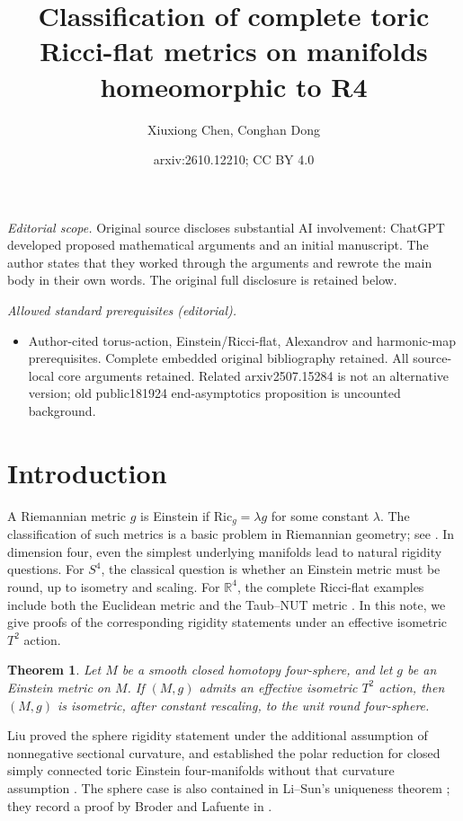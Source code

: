 \documentclass[letterpaper]{amsart}
\title{Classification of complete toric Ricci-flat metrics on manifolds homeomorphic to R4}
\author{Xiuxiong Chen, Conghan Dong}
\date{arxiv:2610.12210; CC BY 4.0}
\newtheorem{thm}{Theorem}[section]
\theoremstyle{definition}
\theoremstyle{remark}
\begin{document}
\maketitle
\noindent\textit{Editorial scope.} Original source discloses substantial AI involvement: ChatGPT developed proposed mathematical arguments and an initial manuscript. The author states that they worked through the arguments and rewrote the main body in their own words. The original full disclosure is retained below.\par\medskip
\noindent\textit{Allowed standard prerequisites (editorial).}\begin{itemize}
\item Author-cited torus-action, Einstein/Ricci-flat, Alexandrov and harmonic-map prerequisites. Complete embedded original bibliography retained. All source-local core arguments retained. Related arxiv2507.15284 is not an alternative version; old public181924 end-asymptotics proposition is uncounted background.
\end{itemize}\medskip
\section{Introduction}
A Riemannian metric $g$ is Einstein if $\mathrm{Ric}_g=\lambda g$ for
some constant $\lambda$. The classification of such metrics is a basic
problem in Riemannian geometry; see \cite{notes-Besse}. In dimension four,
even the simplest underlying manifolds lead to natural rigidity
questions. For $S^4$, the classical question is whether an Einstein
metric must be round, up to isometry and scaling. For $\mathbb R^4$,
the complete Ricci-flat examples include both the Euclidean metric and
the Taub--NUT metric \cite{notes-Hawking,notes-GibbonsHawking}.
In this note, we give proofs of the corresponding rigidity statements
under an effective isometric $T^2$ action.

\begin{thm}\label{thm-sphere}
Let $M$ be a smooth closed homotopy four-sphere, and let $g$ be an Einstein metric
on $M$. If $(M,g)$ admits an effective isometric $T^2$ action, then $(M,g)$
is isometric, after constant rescaling, to the unit round four-sphere.
\end{thm}

Liu proved the sphere rigidity statement under the additional assumption
of nonnegative sectional curvature, and established the polar reduction
for closed simply connected toric Einstein four-manifolds without that
curvature assumption \cite[Theorems~1.1--1.2]{notes-Liu}.
The sphere case is also contained in Li--Sun's uniqueness theorem
\cite[Theorem~1.5]{notes-LiSunCompact}; they record a proof by Broder and
Lafuente in \cite[Remark~D.19]{notes-LiSunCompact}.
\end{document}
